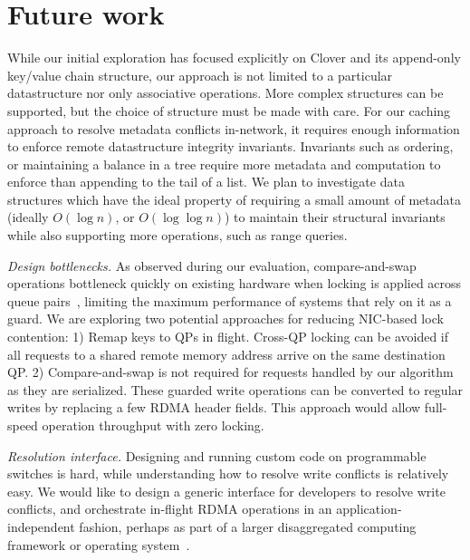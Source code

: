 \section{Future work}

While our initial exploration has focused explicitly on Clover and its
append-only key/value chain structure, our approach is not limited to
a particular datastructure nor only associative operations. More
complex structures can be supported, but the choice of structure must
be made with care.  For our caching approach to resolve metadata
conflicts in-network, it requires enough information to enforce remote
datastructure integrity invariants. Invariants such as ordering, or
maintaining a balance in a tree require more metadata and computation
to enforce than appending to the tail of a list. We plan to
investigate data structures which have the ideal property of requiring
a small amount of metadata (ideally $O(\log n)$, or $O(\log\log n)$) to
maintain their structural invariants while also supporting more
operations, such as range queries.

\emph{Design bottlenecks.} As observed during our evaluation,
compare-and-swap operations bottleneck quickly on existing hardware
when locking is applied across queue pairs~\cite{design-guidelines},
limiting the maximum performance of systems that rely on it as a
guard.  We are exploring two potential approaches for reducing
NIC-based lock contention: 1) Remap keys to QPs in flight. Cross-QP
locking can be avoided if all requests to a shared remote memory
address arrive on the same destination QP. 2) Compare-and-swap is not
required for requests handled by our algorithm as they are serialized.
These guarded write operations can be converted to regular writes by
replacing a few RDMA header fields. This approach would allow
full-speed operation throughput with zero locking.


\emph{Resolution interface.}
Designing and running custom code on programmable switches is hard,
while understanding how to resolve write conflicts is relatively
easy. We would like to design a generic interface for developers to
resolve write conflicts, and orchestrate in-flight RDMA operations in
an application-independent fashion, perhaps as part of a larger
disaggregated computing framework or operating system~\cite{legoos}.
